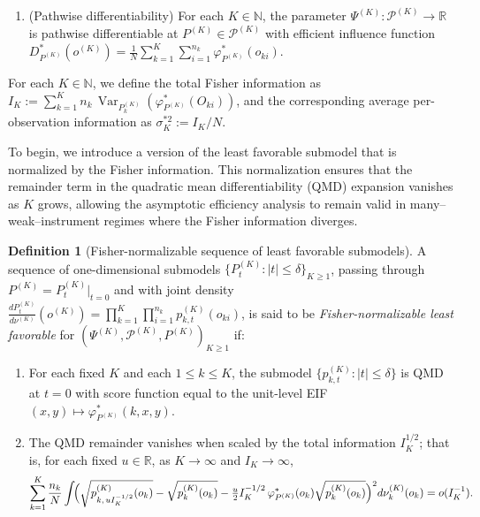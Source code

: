 \documentclass[11pt]{article}
\theoremstyle{plain}
\theoremstyle{definition}
\newtheorem{definition}{Definition}
\theoremstyle{remark}
\theoremstyle{definition}
\begin{document}
\begin{enumerate}[label=\textbf{F\arabic*)}, ref=F\arabic*, series=eff]
    \item \label{cond::pathwiseff} {(Pathwise differentiability)}  
    For each \(K \in \mathbb{N}\), the parameter \(\Psi^{(K)}: \mathcal{P}^{(K)} \to \mathbb{R}\) is pathwise differentiable at \(P^{(K)} \in \mathcal{P}^{(K)}\) with efficient influence function  $D_{P^{(K)}}^*(o^{(K)}) = \tfrac{1}{N} \sum_{k=1}^K \sum_{i=1}^{n_k} \varphi_{P^{(K)}}^*(o_{ki})$.
\end{enumerate}
 \noindent For each \(K \in \mathbb{N}\), we define the total Fisher information as  
\(I_K := \sum_{k=1}^K n_k\,\operatorname{Var}_{P_k^{(K)}}(\varphi_{P^{(K)}}^*(O_{ki}))\),  
and the corresponding average per-observation information as \(\sigma_K^{*2} := I_K / N\).
 

To begin, we introduce a version of the least favorable submodel that is
normalized by the Fisher information. This normalization ensures that the
remainder term in the quadratic mean differentiability (QMD) expansion vanishes
as \(K\) grows, allowing the asymptotic efficiency analysis to remain valid in
many--weak--instrument regimes where the Fisher information diverges.

\begin{definition}[Fisher-normalizable sequence of least favorable submodels]
\label{def:leastfavorablemain}
A sequence of one-dimensional submodels
\(\{P_t^{(K)} : |t| \le \delta\}_{K \ge 1}\), passing through
\(P^{(K)} = P_t^{(K)}|_{t=0}\) and with joint density
\(\tfrac{dP_t^{(K)}}{d\nu^{(K)}}(o^{(K)}) = \prod_{k=1}^K \prod_{i=1}^{n_k}
p_{k,t}^{(K)}(o_{ki})\), is said to be \emph{Fisher-normalizable least
favorable} for \((\Psi^{(K)}, \mathcal{P}^{(K)}, P^{(K)})_{K \ge 1}\) if:
\begin{enumerate}
\item[(i)] For each fixed \(K\) and each \(1 \le k \le K\), the submodel
\(\{p_{k,t}^{(K)} : |t| \le \delta\}\) is QMD at \(t=0\) with score function equal
to the unit-level EIF \((x,y) \mapsto \varphi^*_{P^{(K)}}(k,x,y)\).
\item[(ii)] The QMD remainder vanishes when scaled by the total information
\(I_K^{1/2}\); that is, for each fixed \(u \in \mathbb{R}\), as \(K \to \infty\)
and \(I_K \to \infty\),
\[
\sum_{k=1}^K \frac{n_k}{N} \int\!
\Bigl(
\sqrt{p_{k,\,u I_K^{-1/2}}^{(K)}(o_k)} - \sqrt{p_k^{(K)}(o_k)}
 - \tfrac{u}{2} I_K^{-1/2}\, \varphi_{P^{(K)}}^*(o_k)\sqrt{p_k^{(K)}(o_k)}
\Bigr)^2 d\nu_k^{(K)}(o_k)
= o(I_K^{-1}).
\]
\end{enumerate}
\end{definition}
\end{document}
